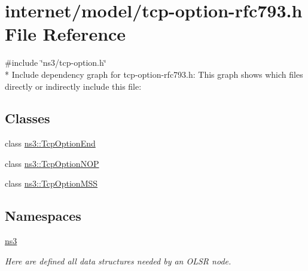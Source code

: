 \hypertarget{tcp-option-rfc793_8h}{}\section{internet/model/tcp-\/option-\/rfc793.h File Reference}
\label{tcp-option-rfc793_8h}
{\ttfamily \#include \char`\"{}ns3/tcp-\/option.\+h\char`\"{}}\\*
Include dependency graph for tcp-\/option-\/rfc793.h\+:
This graph shows which files directly or indirectly include this file\+:
\subsection*{Classes}
\begin{DoxyCompactItemize}
\item 
class \hyperlink{classns3_1_1TcpOptionEnd}{ns3\+::\+Tcp\+Option\+End}
\item 
class \hyperlink{classns3_1_1TcpOptionNOP}{ns3\+::\+Tcp\+Option\+N\+OP}
\item 
class \hyperlink{classns3_1_1TcpOptionMSS}{ns3\+::\+Tcp\+Option\+M\+SS}
\end{DoxyCompactItemize}
\subsection*{Namespaces}
\begin{DoxyCompactItemize}
\item 
 \hyperlink{namespacens3}{ns3}
\begin{DoxyCompactList}\small\item\em Here are defined all data structures needed by an O\+L\+SR node. \end{DoxyCompactList}\end{DoxyCompactItemize}
